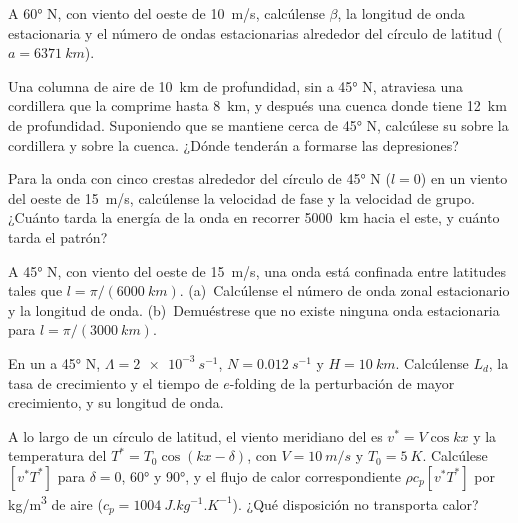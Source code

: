 \begin{exercise}[$\star$]\label{exo:b3:atmospheric-dynamics:4}
A \ang{60} N, con viento del oeste de \qty{10}{m/s}, calcúlense $\beta$, la
longitud de onda estacionaria y el número de ondas estacionarias alrededor del
círculo de latitud ($a = \qty{6371}{km}$).
\end{exercise}

\begin{exercise}[$\star\star$]\label{exo:b3:atmospheric-dynamics:5}
Una columna de aire de \qty{10}{km} de profundidad, sin  a \ang{45}
N, atraviesa una cordillera que la comprime hasta \qty{8}{km}, y después una cuenca
donde tiene \qty{12}{km} de profundidad. Suponiendo que se mantiene cerca de \ang{45} N, calcúlese su
 sobre la cordillera y sobre la cuenca. ¿Dónde
tenderán a formarse las depresiones?
\end{exercise}

\begin{exercise}[$\star\star$]\label{exo:b3:atmospheric-dynamics:6}
Para la onda con cinco crestas alrededor del círculo de \ang{45} N ($l = 0$) en un
viento del oeste de \qty{15}{m/s}, calcúlense la velocidad de fase y la velocidad de grupo.
¿Cuánto tarda la energía de la onda en recorrer \qty{5000}{km} hacia el este, y
cuánto tarda el patrón?
\end{exercise}

\begin{exercise}[$\star\star$]\label{exo:b3:atmospheric-dynamics:7}
A \ang{45} N, con viento del oeste de \qty{15}{m/s}, una onda está confinada entre
latitudes tales que $l = \pi/(\qty{6000}{km})$. (a)~Calcúlense el número de onda
zonal estacionario y la longitud de onda. (b)~Demuéstrese que no existe ninguna onda estacionaria para
$l = \pi/(\qty{3000}{km})$.
\end{exercise}

\begin{exercise}[$\star\star$]\label{exo:b3:atmospheric-dynamics:8}
En un  a \ang{45} N, $\Lambda = \qty{2e-3}{s^{-1}}$, $N =
\qty{0.012}{s^{-1}}$ y $H = \qty{10}{km}$. Calcúlense $L_d$, la tasa de crecimiento
y el tiempo de $e$-folding de la perturbación de mayor crecimiento, y su
longitud de onda.
\end{exercise}

\begin{exercise}[$\star\star$]\label{exo:b3:atmospheric-dynamics:9}
A lo largo de un círculo de latitud, el viento meridiano del  es $v^* = V\cos kx$ y la
temperatura del  $T^* = T_0\cos(kx - \delta)$, con $V = \qty{10}{m/s}$ y
$T_0 = \qty{5}{K}$. Calcúlese $[v^*T^*]$ para $\delta = 0$, \ang{60} y
\ang{90}, y el flujo de calor correspondiente $\rho c_p[v^*T^*]$ por
\unit{kg/m^3} de aire ($c_p = \qty{1004}{J.kg^{-1}.K^{-1}}$). ¿Qué
disposición no transporta calor?
\end{exercise}

